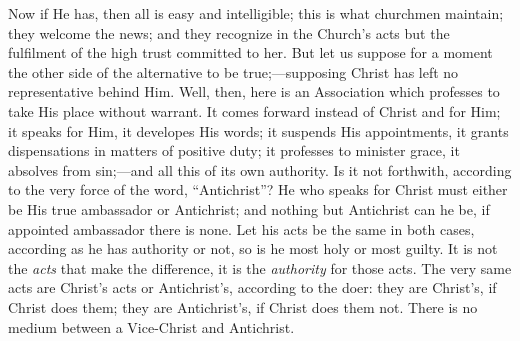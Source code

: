 Now if He has, then all is easy and intelligible; this is what
churchmen maintain; they welcome the news; and they recognize in the
Church's acts but the fulfilment of the high trust committed to her.
But let us suppose for a moment the other side of the alternative to
be true;—supposing Christ has left no representative behind Him.
Well, then, here is an Association which professes to take His place
without warrant. It comes forward instead of Christ and for Him; it
speaks for Him, it developes His words; it suspends His appointments,
it grants dispensations in matters of positive duty; it professes to
minister grace, it absolves from sin;—and all this of its own
authority. Is it not forthwith, according to the very force of the
word, ``Antichrist''? He who speaks for Christ must either be
His true ambassador or Antichrist; and nothing but Antichrist can he
be, if appointed ambassador there is none. Let his acts be the same in
both cases, according as he has authority or not, so is he most holy
or most guilty. It is not the \emph{acts} that make the difference, it is the
\emph{authority} for those acts. The very same acts are Christ's acts
or Antichrist's, according to the doer: they are Christ's, if Christ
does them; they are Antichrist's, if Christ does them not. There
is no medium between a Vice-Christ and Antichrist.

